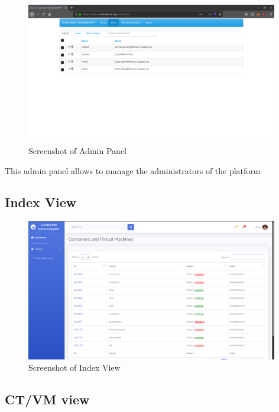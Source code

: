 \begin{figure}[!h]
  \centering
  \includegraphics[width=0.98\textwidth]{images/flask-application-0.png}
  \caption{Screenshot of Admin Panel}
  \label{AdminPanel}
\end{figure}

This admin panel allows to manage the administrators of the platform

\pagebreak

\subsection{Index View}

\begin{figure}[!h]
  \centering
  \includegraphics[width=0.98\textwidth]{images/flask-application-1.png}
  \caption{Screenshot of Index View}
  \label{IndexView}
\end{figure}

\pagebreak

\subsection{CT/VM view}

